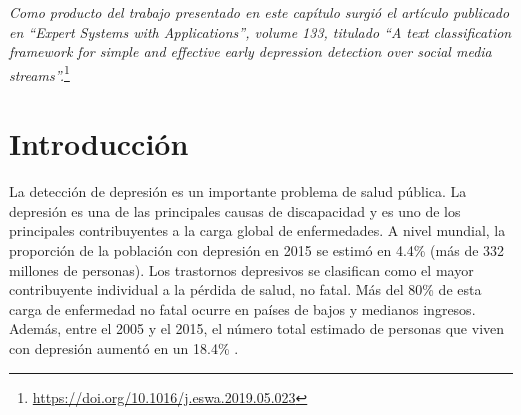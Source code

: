 
\emph{Como producto del trabajo presentado en este capítulo surgió el artículo publicado en ``Expert Systems with Applications'', volume 133, titulado ``A text classification framework for simple and effective early depression detection over social media streams''.}\footnote{\url{https://doi.org/10.1016/j.eswa.2019.05.023}}

\section{Introducción}

La detección de depresión es un importante problema de salud pública. La depresión es una de las principales causas de discapacidad y es uno de los principales contribuyentes a la carga global de enfermedades.
A nivel mundial, la proporción de la población con depresión en 2015 se estimó en 4.4\% (más de 332 millones de personas).
Los trastornos depresivos se clasifican como el mayor contribuyente individual a la pérdida de salud, no fatal.
Más del 80\% de esta carga de enfermedad no fatal ocurre en países de bajos y medianos ingresos.
Además, entre el 2005 y el 2015, el número total estimado de personas que viven con depresión aumentó en un 18.4\% \cite{who2017}.


